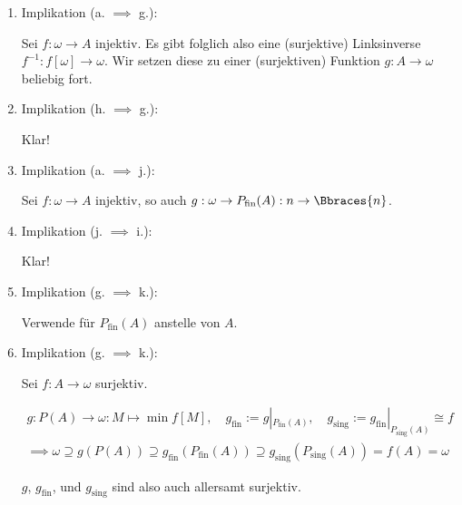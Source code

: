 \begin{solution}
\begin{enumerate}[label = \arabic*.]
  \item Implikation (a. $\implies$ g.):
  
  Sei $f: \omega \to A$ injektiv.
  Es gibt folglich also eine (surjektive) Linksinverse $f^{-1}: f[\omega] \to \omega$.
  Wir setzen diese zu einer (surjektiven) Funktion $g: A \to \omega$ beliebig fort.

  \item Implikation (h. $\implies$ g.):
  
  Klar!

  \item Implikation (a. $\implies$ j.):

  Sei $f: \omega \to A$ injektiv, so auch $g: \omega \to P_\mathrm{fin}(A): n \to \Bbraces{n}$.

  \item Implikation (j. $\implies$ i.):

  Klar!

  \item Implikation (g. $\implies$ k.):

  Verwende  für $P_\mathrm{fin}(A)$ anstelle von $A$.

  \item Implikation (g. $\implies$ k.):

  Sei $f: A \to \omega$ surjektiv.

  \begin{gather*}
    g:
    P(A) \to \omega:
    M \mapsto \min f[M],
    \quad
    g_\mathrm{fin} := g |_{P_\mathrm{fin}(A)},
    \quad
    g_\mathrm{sing} := g_\mathrm{fin} |_{P_\mathrm{sing}(A)} \cong f \\
    \implies
    \omega
    \supseteq
    g(P(A))
    \supseteq
    g_\mathrm{fin}(P_\mathrm{fin}(A))
    \supseteq
    g_\mathrm{sing}(P_\mathrm{sing}(A))
    =
    f(A)
    =
    \omega
  \end{gather*}

  $g$, $g_\mathrm{fin}$, und $g_\mathrm{sing}$ sind also auch allersamt surjektiv.

\end{enumerate}

\end{solution}


